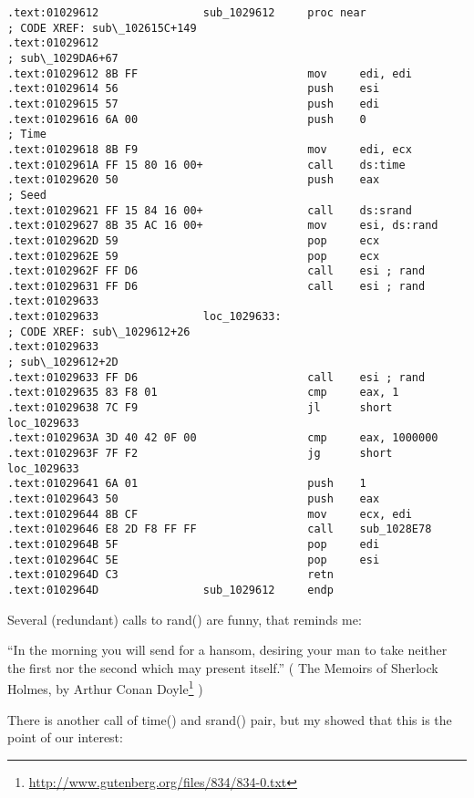 \begin{lstlisting}[style=customasmx86]
.text:01029612                sub_1029612     proc near               ; CODE XREF: sub\_102615C+149
.text:01029612                                                        ; sub\_1029DA6+67
.text:01029612 8B FF                          mov     edi, edi
.text:01029614 56                             push    esi
.text:01029615 57                             push    edi
.text:01029616 6A 00                          push    0               ; Time
.text:01029618 8B F9                          mov     edi, ecx
.text:0102961A FF 15 80 16 00+                call    ds:time
.text:01029620 50                             push    eax             ; Seed
.text:01029621 FF 15 84 16 00+                call    ds:srand
.text:01029627 8B 35 AC 16 00+                mov     esi, ds:rand
.text:0102962D 59                             pop     ecx
.text:0102962E 59                             pop     ecx
.text:0102962F FF D6                          call    esi ; rand
.text:01029631 FF D6                          call    esi ; rand
.text:01029633
.text:01029633                loc_1029633:                            ; CODE XREF: sub\_1029612+26
.text:01029633                                                        ; sub\_1029612+2D
.text:01029633 FF D6                          call    esi ; rand
.text:01029635 83 F8 01                       cmp     eax, 1
.text:01029638 7C F9                          jl      short loc_1029633
.text:0102963A 3D 40 42 0F 00                 cmp     eax, 1000000
.text:0102963F 7F F2                          jg      short loc_1029633
.text:01029641 6A 01                          push    1
.text:01029643 50                             push    eax
.text:01029644 8B CF                          mov     ecx, edi
.text:01029646 E8 2D F8 FF FF                 call    sub_1028E78
.text:0102964B 5F                             pop     edi
.text:0102964C 5E                             pop     esi
.text:0102964D C3                             retn
.text:0102964D                sub_1029612     endp
\end{lstlisting}

Several (redundant) calls to rand() are funny, that reminds me:

``In the morning you will send for a hansom, desiring your man to take neither the first nor the second which may present itself.''
( The Memoirs of Sherlock Holmes, by Arthur Conan Doyle\footnote{\url{http://www.gutenberg.org/files/834/834-0.txt}} )

There is another call of time() and srand() pair, but my \tracer showed that this is the point of our interest:

